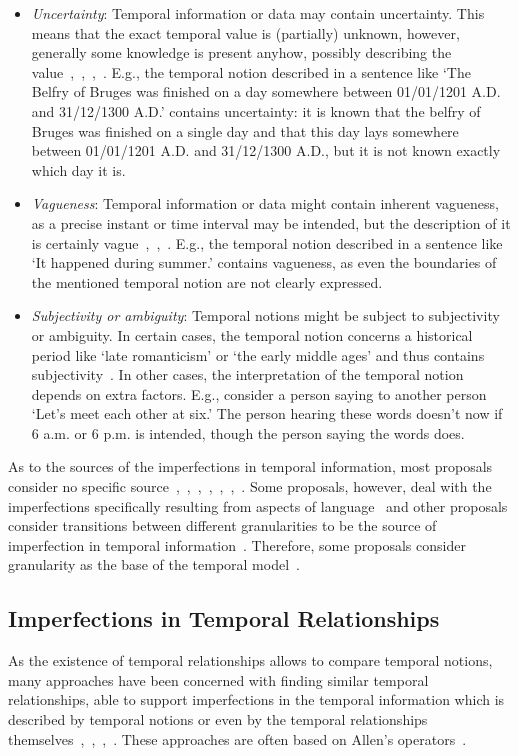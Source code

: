 \begin{itemize}
	\item \emph{Uncertainty}: Temporal information or data may contain uncertainty. This means that the exact temporal value is (partially) unknown, however, generally some knowledge is present anyhow, possibly describing the value~\cite{Dubois:jucs_9_9:fuzziness_and_uncertainty_in},~\cite{nagypal2003},~\cite{Dubois89},~\cite{343607}. E.g., the temporal notion described in a sentence like `The Belfry of Bruges was finished on a day somewhere between 01/01/1201 A.D. and 31/12/1300 A.D.' contains uncertainty: it is known that the belfry of Bruges was finished on a single day and that this day lays somewhere between 01/01/1201 A.D. and 31/12/1300 A.D., but it is not known exactly which day it is.
	\item \emph{Vagueness}: Temporal information or data might contain inherent vagueness, as a precise instant or time interval may be intended, but the description of it is certainly vague~\cite{schockaert08},~\cite{nagypal2003},~\cite{Dev98}. E.g., the temporal notion described in a sentence like `It happened during summer.' contains vagueness, as even the boundaries of the mentioned temporal notion are not clearly expressed.
	\item \emph{Subjectivity or ambiguity}: Temporal notions might be subject to subjectivity or ambiguity. In certain cases, the temporal notion concerns a historical period like `late romanticism' or `the early middle ages' and thus contains subjectivity~\cite{nagypal2003}. In other cases, the interpretation of the temporal notion depends on extra factors. E.g., consider a person saying to another person `Let's meet each other at six.' The person hearing these words doesn't now if 6 a.m. or 6 p.m. is intended, though the person saying the words does.
\end{itemize}

As to the sources of the imperfections in temporal information, most proposals consider no specific source~\cite{5151},~\cite{schockaert08},~\cite{nagypal2003},~\cite{Dubois89},~\cite{343607},~\cite{ohlbach2004},~\cite{Virant199639}. Some proposals, however, deal with the imperfections specifically resulting from aspects of language~\cite{Dev98} and other proposals consider transitions between different granularities to be the source of imperfection in temporal information~\cite{Lin97}. Therefore, some proposals consider granularity as the base of the temporal model~\cite{Cru97}.


\subsection{Imperfections in Temporal Relationships}
As the existence of temporal relationships allows to compare temporal notions, many approaches have been concerned with finding similar temporal relationships, able to support imperfections in the temporal information which is described by temporal notions or even by the temporal relationships themselves~\cite{ohlbach2004},~\cite{nagypal2003},~\cite{schockaert08},~\cite{Dubois:jucs_9_9:fuzziness_and_uncertainty_in}. These approaches are often based on Allen's operators~\cite{Allen83}.

